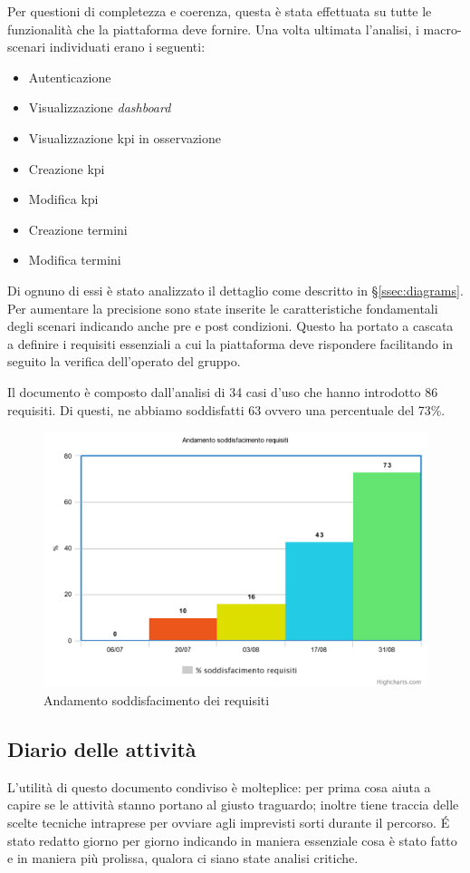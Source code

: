 Per questioni di completezza e coerenza, questa è stata effettuata su tutte le funzionalità che la piattaforma deve fornire.
Una volta ultimata l'analisi, i macro-scenari individuati erano i seguenti:
\begin{itemize}
    \item Autenticazione
    \item Visualizzazione \textit{dashboard}
    \item Visualizzazione \acrshort{kpi} in osservazione
    \item Creazione \acrshort{kpi}
    \item Modifica \acrshort{kpi}
    \item Creazione termini
    \item Modifica termini
\end{itemize}

Di ognuno di essi è stato analizzato il dettaglio come descritto in \S\ref{ssec:diagrams}.
Per aumentare la precisione sono state inserite le caratteristiche fondamentali degli scenari indicando anche pre e post condizioni.
Questo ha portato a cascata a definire i requisiti essenziali a cui la piattaforma deve rispondere facilitando in seguito la verifica dell'operato del gruppo.

Il documento è composto dall'analisi di 34 casi d'uso che hanno introdotto 86 requisiti. Di questi, ne abbiamo soddisfatti 63 ovvero una percentuale del 73\%.
\begin{figure}[H]
    \centering
    \includegraphics[width=0.65\columnwidth]{immagini/chart.png}
    \caption{Andamento soddisfacimento dei requisiti}
    \label{fig:reqChart}
\end{figure}
\subsection{Diario delle attività}
L'utilità di questo documento condiviso è molteplice: per prima cosa aiuta a capire se le attività stanno portano al giusto traguardo; inoltre tiene traccia delle scelte tecniche intraprese per ovviare agli imprevisti sorti durante il percorso. \'E stato redatto giorno per giorno indicando in maniera essenziale cosa è stato fatto e in maniera più prolissa, qualora ci siano state analisi critiche.
